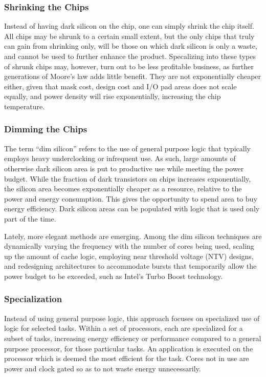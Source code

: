 \subsubsection{Shrinking the Chips}

Instead of having dark silicon on the chip, one can simply shrink the chip itself.
All chips may be shrunk to a certain small extent, but the only chips that truly can gain from shrinking only, will be those on which dark silicon is only a waste, and cannot be used to further enhance the product.   
Specalizing into these types of shrunk chips may, however, turn out to be less profitable business, as further generations of Moore's law adds little benefit. 
They are not exponentially cheaper either, given that mask cost, design cost and I/O pad areas does not scale equally, and power density will rise exponentially, increasing the chip temperature.

\subsubsection{Dimming the Chips}
The term ``dim silicon'' refers to the use of general purpose logic that typically employs heavy underclocking or infrequent use.
As such, large amounts of otherwise dark silicon area is put to productive use while meeting the power budget.
While the fraction of dark transistors on chips increases exponentially, the silicon area becomes exponentially cheaper
as a resource, relative to the power and energy consumption. This gives the opportunity to spend area to buy energy efficiency.
Dark silicon areas can be populated with logic that is used only part of the time.

Lately, more elegant methods are emerging. Among the dim silicon techniques are dynamically varying the frequency with the
number of cores being used, scaling up the amount of cache logic, employing near threshold voltage (NTV) designs, and redesigning
architectures to accommodate bursts that temporarily allow the power budget to be exceeded, such as Intel's Turbo Boost technology. \cite{dark-silicon}

\subsubsection{Specialization}
Instead of using general purpose logic, this approach focuses on specialized use of logic for selected tasks.
Within a set of processors, each are specialized for a subset of tasks, increasing energy efficiency or performance compared to a general purpose processor, for those particular tasks.
An application is executed on the processor which is deemed the most efficient for the task.
Cores not in use are power and clock gated so as to not waste energy unnecessarily.

